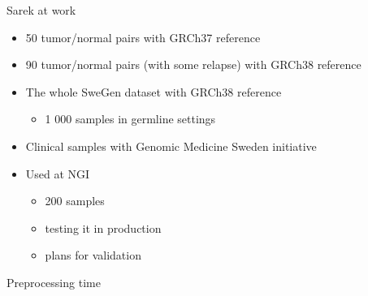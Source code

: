 \documentclass[usepdftitle=false]{beamer}
\begin{document}
\begin{frame}{Sarek at work}
	\begin{itemize}
		\item	50 tumor/normal pairs with GRCh37 reference
		\pause
		\item	90 tumor/normal pairs (with some relapse) with GRCh38 reference
		\pause
		\item	The whole SweGen dataset with GRCh38 reference
		\begin{itemize}
			\item	1 000 samples in germline settings
		\end{itemize}
		\pause
		\item	Clinical samples with Genomic Medicine Sweden initiative
		\pause
		\item	Used at NGI
		\begin{itemize}
			\item	200 samples
			\item	testing it in production
			\item	plans for validation
		\end{itemize}
	\end{itemize}
\end{frame}

\begin{frame}{Preprocessing time}
	\begin{figure}
	\end{figure}
\end{frame}
\end{document}
